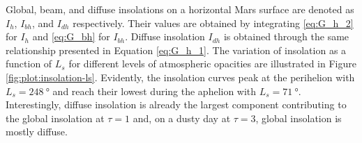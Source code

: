Global, beam, and diffuse insolations on a horizontal Mars surface are denoted as $I_{h}$, $I_{bh}$, and $I_{dh}$ respectively. Their values are obtained by integrating \ref{eq:G_h_2} for $I_{h}$ and \ref{eq:G_bh} for $I_{bh}$. Diffuse insolation $I_{dh}$ is obtained through the same relationship presented in Equation \ref{eq:G_h_1}. The variation of insolation as a function of $L_{s}$ for different levels of atmospheric opacities are illustrated in Figure \ref{fig:plot:insolation-ls}. Evidently, the insolation curves peak at the perihelion with $L_{s} = \SI{248}{\degree}$ and reach their lowest during the aphelion with $L_{s} = \SI{71}{\degree}$. Interestingly, diffuse insolation is already the largest component contributing to the global insolation at $\tau = 1$ and, on a dusty day at $\tau = 3$, global insolation is mostly diffuse.


